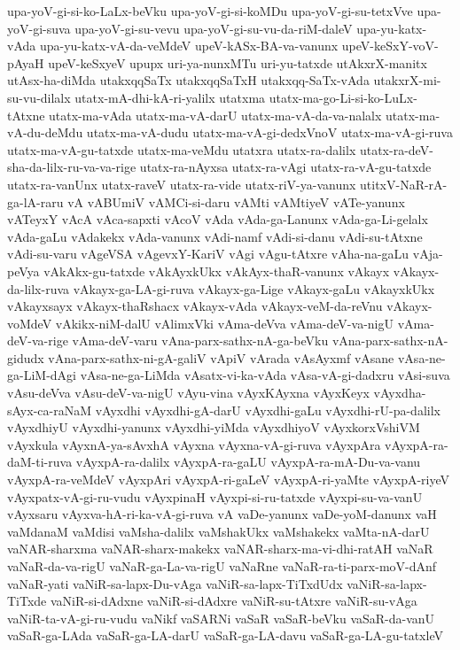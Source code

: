 {upa-yoV-gi-si-ko-LaLx-beVku
upa-yoV-gi-si-koMDu
upa-yoV-gi-su-tetxVve
upa-yoV-gi-suva
upa-yoV-gi-su-vevu
upa-yoV-gi-su-vu-da-riM-daleV
upa-yu-katx-vAda
upa-yu-katx-vA-da-veMdeV
upeV-kASx-BA-va-vanunx
upeV-keSxY-voV-pAyaH
upeV-keSxyeV
upupx
uri-ya-nunxMTu
uri-yu-tatxde
utAkxrX-manitx
utAsx-ha-diMda
utakxqqSaTx
utakxqqSaTxH
utakxqq-SaTx-vAda
utakxrX-mi-su-vu-dilalx
utatx-mA-dhi-kA-ri-yalilx
utatxma
utatx-ma-go-Li-si-ko-LuLx-tAtxne
utatx-ma-vAda
utatx-ma-vA-darU
utatx-ma-vA-da-va-nalalx
utatx-ma-vA-du-deMdu
utatx-ma-vA-dudu
utatx-ma-vA-gi-dedxVnoV
utatx-ma-vA-gi-ruva
utatx-ma-vA-gu-tatxde
utatx-ma-veMdu
utatxra
utatx-ra-dalilx
utatx-ra-deV-sha-da-lilx-ru-va-va-rige
utatx-ra-nAyxsa
utatx-ra-vAgi
utatx-ra-vA-gu-tatxde
utatx-ra-vanUnx
utatx-raveV
utatx-ra-vide
utatx-riV-ya-vanunx
utitxV-NaR-rA-ga-lA-raru
vA
vABUmiV
vAMCi-si-daru
vAMti
vAMtiyeV
vATe-yanunx
vATeyxY
vAcA
vAca-sapxti
vAcoV
vAda
vAda-ga-Lanunx
vAda-ga-Li-gelalx
vAda-gaLu
vAdakekx
vAda-vanunx
vAdi-namf
vAdi-si-danu
vAdi-su-tAtxne
vAdi-su-varu
vAgeVSA
vAgevxY-KariV
vAgi
vAgu-tAtxre
vAha-na-gaLu
vAja-peVya
vAkAkx-gu-tatxde
vAkAyxkUkx
vAkAyx-thaR-vanunx
vAkayx
vAkayx-da-lilx-ruva
vAkayx-ga-LA-gi-ruva
vAkayx-ga-Lige
vAkayx-gaLu
vAkayxkUkx
vAkayxsayx
vAkayx-thaRshacx
vAkayx-vAda
vAkayx-veM-da-reVnu
vAkayx-voMdeV
vAkikx-niM-dalU
vAlimxVki
vAma-deVva
vAma-deV-va-nigU
vAma-deV-va-rige
vAma-deV-varu
vAna-parx-sathx-nA-ga-beVku
vAna-parx-sathx-nA-gidudx
vAna-parx-sathx-ni-gA-galiV
vApiV
vArada
vAsAyxmf
vAsane
vAsa-ne-ga-LiM-dAgi
vAsa-ne-ga-LiMda
vAsatx-vi-ka-vAda
vAsa-vA-gi-dadxru
vAsi-suva
vAsu-deVva
vAsu-deV-va-nigU
vAyu-vina
vAyxKAyxna
vAyxKeyx
vAyxdha-sAyx-ca-raNaM
vAyxdhi
vAyxdhi-gA-darU
vAyxdhi-gaLu
vAyxdhi-rU-pa-dalilx
vAyxdhiyU
vAyxdhi-yanunx
vAyxdhi-yiMda
vAyxdhiyoV
vAyxkorxVshiVM
vAyxkula
vAyxnA-ya-sAvxhA
vAyxna
vAyxna-vA-gi-ruva
vAyxpAra
vAyxpA-ra-daM-ti-ruva
vAyxpA-ra-dalilx
vAyxpA-ra-gaLU
vAyxpA-ra-mA-Du-va-vanu
vAyxpA-ra-veMdeV
vAyxpAri
vAyxpA-ri-gaLeV
vAyxpA-ri-yaMte
vAyxpA-riyeV
vAyxpatx-vA-gi-ru-vudu
vAyxpinaH
vAyxpi-si-ru-tatxde
vAyxpi-su-va-vanU
vAyxsaru
vAyxva-hA-ri-ka-vA-gi-ruva
vA‌
vaDe-yanunx
vaDe-yoM-danunx
vaH
vaMdanaM
vaMdisi
vaMsha-dalilx
vaMshakUkx
vaMshakekx
vaMta-nA-darU
vaNAR-sharxma
vaNAR-sharx-makekx
vaNAR-sharx-ma-vi-dhi-ratAH
vaNaR
vaNaR-da-va-rigU
vaNaR-ga-La-va-rigU
vaNaRne
vaNaR-ra-ti-parx-moV-dAnf
vaNaR-yati
vaNiR-sa-lapx-Du-vAga
vaNiR-sa-lapx-TiTxdUdx
vaNiR-sa-lapx-TiTxde
vaNiR-si-dAdxne
vaNiR-si-dAdxre
vaNiR-su-tAtxre
vaNiR-su-vAga
vaNiR-ta-vA-gi-ru-vudu
vaNikf
vaSARNi
vaSaR
vaSaR-beVku
vaSaR-da-vanU
vaSaR-ga-LAda
vaSaR-ga-LA-darU
vaSaR-ga-LA-davu
vaSaR-ga-LA-gu-tatxleV
}
